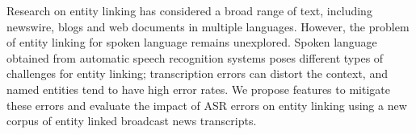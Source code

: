 Research on entity linking has considered a broad range of text, including newswire, blogs and web documents in multiple languages. However, the problem of entity linking for spoken language remains unexplored. Spoken language obtained from automatic speech recognition systems poses different types of challenges for entity linking; transcription errors can distort the context, and named entities tend to have high error rates. We propose features to mitigate these errors and  evaluate the impact of ASR errors on entity linking using a new corpus of entity linked broadcast news transcripts.
